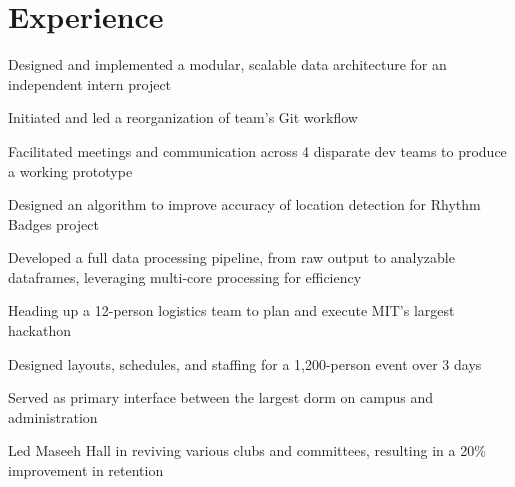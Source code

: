 \documentclass[]{deedy-resume-openfont}
\begin{document}
\section{Experience}
\hfill {}
\sectionsep
\newline
{}\hfill {}
\begin{tightemize}
    \item Designed and implemented a modular, scalable data architecture for an independent intern project
    \item Initiated and led a reorganization of team's Git workflow
    \item Facilitated meetings and communication across 4 disparate dev teams to produce a working prototype
\end{tightemize}
\sectionsep
{}\hfill {}
\begin{tightemize}
	\item Designed an algorithm to improve accuracy of location detection for Rhythm Badges project
	\item Developed a full data processing pipeline, from raw output to analyzable dataframes, leveraging multi-core processing for efficiency
\end{tightemize}
\sectionsep
{}\hfill {}
\begin{tightemize}
    \item Heading up a 12-person logistics team to plan and execute MIT's largest hackathon 
    \item Designed layouts, schedules, and staffing for a 1,200-person event over 3 days
\end{tightemize}
\sectionsep
{}\hfill {}
\begin{tightemize}
    \item Served as primary interface between the largest dorm on campus and administration
    \item Led Maseeh Hall in reviving various clubs and committees, resulting in a 20\% improvement in retention
\end{tightemize}
\sectionsep
\end{document}
